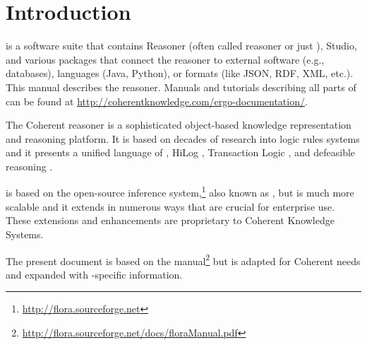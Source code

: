 \section{Introduction}\label{sec-intro}

\ERGOAI is a software suite that contains \ERGOAI Reasoner
(often called \ERGO reasoner or just \ERGO),
\ERGOAI Studio, and various packages that connect the reasoner to
external software (e.g., databases), languages (Java, Python),
or formats (like JSON, RDF, XML, etc.).
This manual describes the \ERGO reasoner.
Manuals and tutorials describing all parts of \ERGOAI
can be found at \url{http://coherentknowledge.com/ergo-documentation/}.


The Coherent \FLSYSTEM reasoner
is a sophisticated object-based  knowledge representation and
reasoning platform. It is based on decades of research into logic rules
systems and it presents a unified language of \fl
\cite{KLW95}, HiLog \cite{hilog-jlp}, Transaction Logic
\cite{trans-chapter-98,trans-tcs94}, and defeasible reasoning
\cite{lpda-iclp-09}.

\FLSYSTEM is based on the open-source \FLORA inference system,\footnote{
  \url{http://flora.sourceforge.net}
}
also known as \ERGOLITE,
but is much more scalable and it extends \ERGOLITE in numerous ways that
are crucial for enterprise use.
These extensions and enhancements are proprietary to Coherent Knowledge
Systems.

The present document is based on the \FLORA manual\footnote{
  \url{http://flora.sourceforge.net/docs/floraManual.pdf}
  }
but is adapted for Coherent needs and expanded with
\ERGO-specific information.



